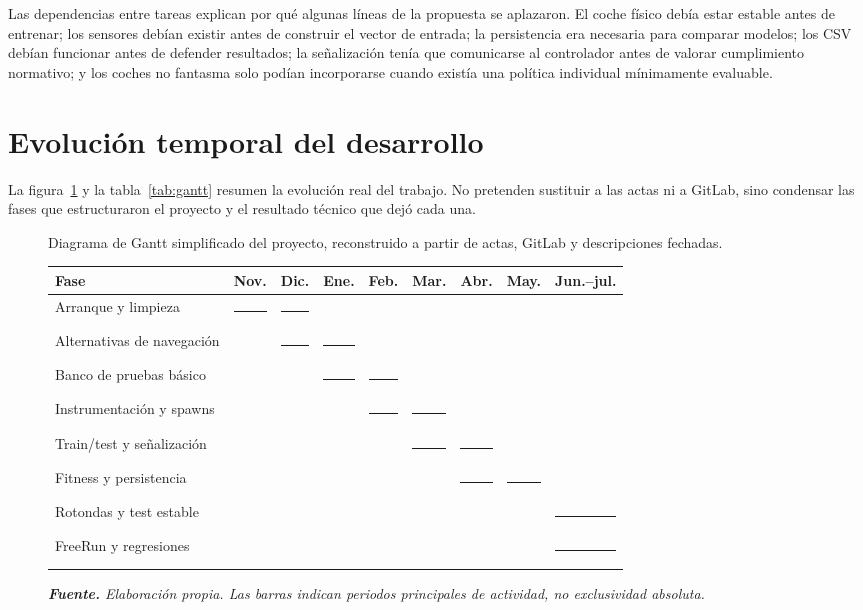 Las dependencias entre tareas explican por qué algunas líneas de la propuesta se aplazaron. El coche físico debía estar estable antes de entrenar; los sensores debían existir antes de construir el vector de entrada; la persistencia era necesaria para comparar modelos; los CSV debían funcionar antes de defender resultados; la señalización tenía que comunicarse al controlador antes de valorar cumplimiento normativo; y los coches no fantasma solo podían incorporarse cuando existía una política individual mínimamente evaluable.

\clearpage
\section{Evolución temporal del desarrollo}

La figura~\ref{fig:gantt-proyecto} y la tabla~\ref{tab:gantt} resumen la evolución real del trabajo. No pretenden sustituir a las actas ni a GitLab, sino condensar las fases que estructuraron el proyecto y el resultado técnico que dejó cada una.

\begin{figure}[htbp]
\centering
\caption[Diagrama de Gantt del proyecto.]{Diagrama de Gantt simplificado del proyecto, reconstruido a partir de actas, GitLab y descripciones fechadas.}%
\label{fig:gantt-proyecto}
\scriptsize
\setlength{\tabcolsep}{3pt}
\begin{tabular}{L{3.5cm}cccccccc}
\toprule
\textbf{Fase} & \textbf{Nov.} & \textbf{Dic.} & \textbf{Ene.} & \textbf{Feb.} & \textbf{Mar.} & \textbf{Abr.} & \textbf{May.} & \textbf{Jun.--jul.}\\
\midrule
Arranque y limpieza & \rule{0.55cm}{0.16cm} & \rule{0.55cm}{0.16cm} & & & & & &\\
Alternativas de navegación & & \rule{0.55cm}{0.16cm} & \rule{0.55cm}{0.16cm} & & & & &\\
Banco de pruebas básico & & & \rule{0.55cm}{0.16cm} & \rule{0.55cm}{0.16cm} & & & &\\
Instrumentación y spawns & & & & \rule{0.55cm}{0.16cm} & \rule{0.55cm}{0.16cm} & & &\\
Train/test y señalización & & & & & \rule{0.55cm}{0.16cm} & \rule{0.55cm}{0.16cm} & &\\
Fitness y persistencia & & & & & & \rule{0.55cm}{0.16cm} & \rule{0.55cm}{0.16cm} &\\
Rotondas y test estable & & & & & & & & \rule{0.55cm}{0.16cm}\\
FreeRun y regresiones & & & & & & & & \rule{0.55cm}{0.16cm}\\
\bottomrule
\end{tabular}
\caption*{\textit{\textbf{Fuente.} Elaboración propia. Las barras indican periodos principales de actividad, no exclusividad absoluta.}}
\end{figure}

